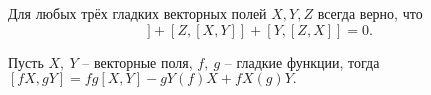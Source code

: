 \begin{to_lem} 
    Для любых трёх гладких векторных полей $X, Y, Z$ всегда верно, что
    \begin{equation*}
        [X, [Y, Z]] + [Z, [X, Y]] + [Y, [Z, X]] = 0.
    \end{equation*}
\end{to_lem}

\begin{to_tas} 
    Пусть $X, \ Y$ -- векторные поля, $f, \ g$ -- гладкие функции, тогда 
    $
    [fX, gY] = fg[X, Y] - gY(f)X + f X(g) Y.
    $ 
\end{to_tas}
































